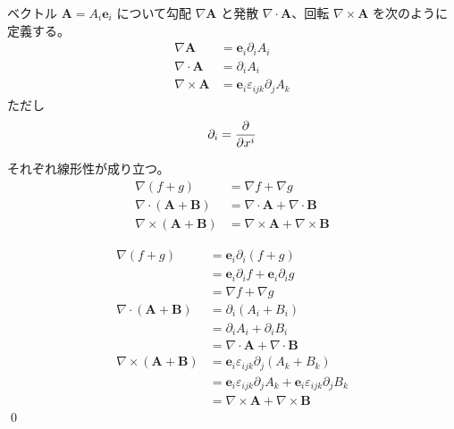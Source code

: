 \documentclass[uplatex,dvipdfmx,a4paper,11pt]{jlreq}
\makeatletter
\renewcommand{\AA}{\bm{A}}
\newcommand{\ee}{\bm{e}}
\newcommand{\grad}{\nabla}
\renewcommand{\div}{\nabla\cdot}
\newcommand{\rot}{\nabla\times}
\theoremstyle{definition}
\renewenvironment{proof}[1][\proofname]{\par
  \normalfont
  \topsep6\p@\@plus6\p@ \trivlist
  \item[\hskip\labelsep{\bfseries #1}\@addpunct{\bfseries}]\ignorespaces\quad\par
}{%
  \qed\endtrivlist\@endpefalse
}
\renewcommand\proofname{証明}
\makeatother
\begin{document}
\begin{definition}
  ベクトル $\AA = A_i\ee_i$ について勾配 $\grad{\AA}$ と発散 $\div{\AA}$、回転 $\rot{\AA}$ を次のように定義する。
  \begin{align}
    \grad{\bm{A}} & = \ee_i\partial_iA_i                     \\
    \div{\bm{A}}  & = \partial_iA_i                          \\
    \rot{\bm{A}}  & = \bm{e}_i\varepsilon_{ijk}\partial_jA_k
  \end{align}
  ただし
  \begin{align}
    \partial_i = \diffp{}{x^i}
  \end{align}
\end{definition}

\begin{theorem}[勾配・発散・回転の線形性]
  それぞれ線形性が成り立つ。
  \begin{align}
    \grad{(f+g)}          & = \grad{f} + \grad{g}         \\
    \div{(\bm{A}+\bm{B})} & = \div{\bm{A}} + \div{\bm{B}} \\
    \rot{(\bm{A}+\bm{B})} & = \rot{\bm{A}} + \rot{\bm{B}}
  \end{align}
\end{theorem}
\begin{proof}
  \begin{align}
    \grad{(f+g)}            & = \ee_i\partial_i(f+g)                                                      \\
                            & = \ee_i\partial_i f + \ee_i\partial_i g                                     \\
                            & = \grad{f} + \grad{g}                                                       \\
    \div{(\bm{A}+\bm{B})}   & = \partial_i(A_i + B_i)                                                     \\
                            & = \partial_i A_i + \partial_i B_i                                           \\
                            & = \div{\bm{A}}+\div{\bm{B}}                                                 \\
    \rot{(\bm{A} + \bm{B})} & = \ee_i\varepsilon_{ijk}\partial_j(A_k + B_k)                               \\
                            & = \ee_i\varepsilon_{ijk}\partial_jA_k + \ee_i\varepsilon_{ijk}\partial_jB_k \\
                            & = \rot{\bm{A}} + \rot{\bm{B}}
  \end{align}
\end{proof}
\end{document}
